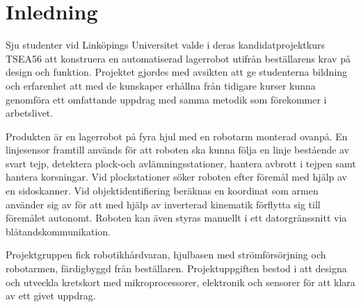

\section{Inledning}
Sju studenter vid Linköpings Universitet valde i deras kandidatprojektkurs TSEA56 att konstruera en automatiserad lagerrobot utifrån beställarens krav på design och funktion. Projektet gjordes med avsikten att ge studenterna bildning och erfarenhet att med de kunskaper erhållna från tidigare kurser kunna genomföra ett omfattande uppdrag med samma metodik som förekommer i arbetslivet.

Produkten är en lagerrobot på fyra hjul med en robotarm monterad ovanpå. En linjesensor framtill används för att roboten ska kunna följa en linje bestående av svart tejp, detektera plock-och avlämningsstationer, hantera avbrott i tejpen samt hantera korsningar. Vid plockstationer söker roboten efter föremål med hjälp av en sidoskanner. Vid objektidentifiering beräknas en koordinat som armen använder sig av för att med hjälp av inverterad kinematik förflytta sig till föremålet autonomt. Roboten kan även styras manuellt i ett datorgränssnitt via blåtandskommunikation. 

Projektgruppen fick robotikhårdvaran, hjulbasen med strömförsörjning och robotarmen, färdigbyggd från beställaren. Projektuppgiften bestod i att designa och utveckla kretskort med mikroprocessorer, elektronik och sensorer för att klara av ett givet uppdrag. 